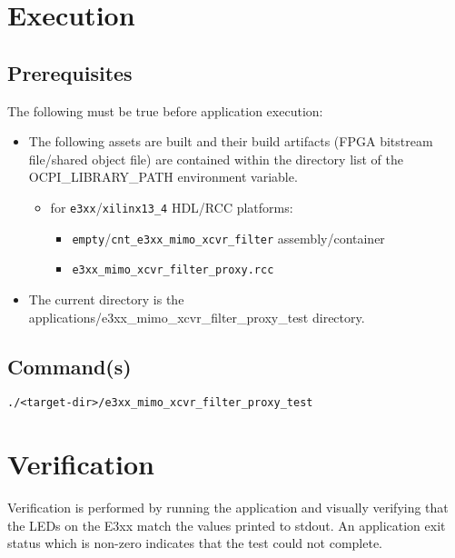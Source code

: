 \section{Execution}
\subsection{Prerequisites}
The following must be true before application execution:
\begin{itemize}
  \item The following assets are built and their build artifacts (FPGA bitstream file/shared object file) are contained within the directory list of the OCPI\_LIBRARY\_PATH environment variable.
  \begin{itemize}
    \item for \verb+e3xx+/\verb+xilinx13_4+ HDL/RCC platforms:
    \begin{itemize}
      \item \verb+empty+/\verb+cnt_e3xx_mimo_xcvr_filter+ assembly/container
      \item \verb+e3xx_mimo_xcvr_filter_proxy.rcc+
    \end{itemize}
  \end{itemize}
\item The current directory is the applications/e3xx\_mimo\_xcvr\_filter\_proxy\_test directory.
\end{itemize}
\subsection{Command(s)}
\begin{lstlisting}
./<target-dir>/e3xx_mimo_xcvr_filter_proxy_test
\end{lstlisting}
\section{Verification}
Verification is performed by running the application and visually verifying that the LEDs on the E3xx match the values printed to stdout. An application exit status which is non-zero indicates that the test could not complete.


